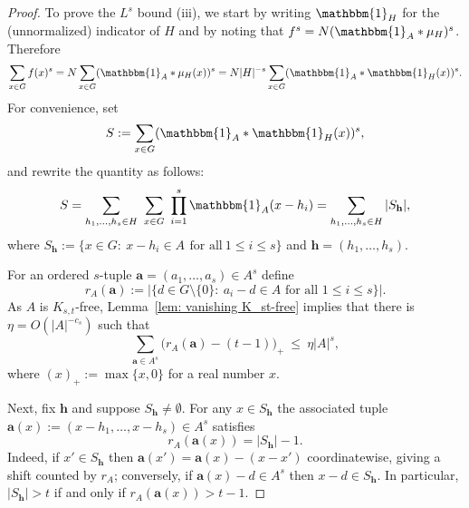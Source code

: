 \documentclass[A4paper,reqno,oneside,12pt]{amsart}
\theoremstyle{plain}
\theoremstyle{definition}
\newcommand{\e}{\mathbbm{1}}          %
\begin{document}
\begin{proof}
To prove the $L^s$ bound (iii), we start by writing $\e_H$ for the (unnormalized) indicator of $H$ and by noting that
$f^s=N(\e_A*\mu_H)^s$.  Therefore
\begin{equation}\label{eqn: fs}
\sum_{x\in G} f(x)^s
=
N\sum_{x\in G} (\e_A*\mu_H(x))^s
=
N|H|^{-s}\sum_{x\in G} (\e_A*\e_H(x))^s.  
\end{equation}
For convenience, set
\[
S:=\sum_{x\in G} (\e_A*\e_H(x))^s,
\]
and rewrite the quantity as follows:
\[
S=\sum_{h_1,\dots,h_s\in H}\ \sum_{x\in G}\ \prod_{i=1}^s \e_A(x-h_i)
=\sum_{h_1,\dots,h_s\in H} |S_{\mathbf{h}}|,
\]
where $S_{\mathbf{h}}:=\{x\in G:\ x-h_i\in A\,\ \text{for all}\ 1\le i \le s\}$ and $\mathbf{h}=(h_1,\dots,h_s)$.

For an ordered $s$-tuple $\mathbf{a}=(a_1,\dots,a_s)\in A^s$ define
\[
r_A(\mathbf{a})
:=
\bigl|\{d\in G\setminus\{0\}:\ a_i-d\in A \text{ for all }1\le i\le s\}\bigr|.
\]
As $A$ is $K_{s,t}$-free, Lemma~\ref{lem: vanishing K_st-free} implies that there is $\eta = O(|A|^{-c_s})$ such that 
\begin{equation}\label{eq:excess_rA}
\sum_{\mathbf{a}\in A^s}\bigl(r_A(\mathbf{a})-(t-1)\bigr)_+ \ \le\ \eta |A|^s,
\end{equation}
 where $(x)_+ := \max\{x,0\}$ for a real number $x$. 

Next, fix $\mathbf{h}$ and suppose $S_{\mathbf{h}}\neq\emptyset$.  For any $x\in S_{\mathbf{h}}$ the
associated tuple $\mathbf{a}(x):=(x-h_1,\dots,x-h_s)\in A^s$ satisfies
\begin{equation}\label{eq:rA_equals_size}
r_A(\mathbf{a}(x))=|S_{\mathbf{h}}|-1.
\end{equation}
Indeed, if $x'\in S_{\mathbf{h}}$ then $\mathbf{a}(x')=\mathbf{a}(x)-(x-x')$ coordinatewise, giving a shift
counted by $r_A$; conversely, if $\mathbf{a}(x)-d\in A^s$ then $x-d\in S_{\mathbf{h}}$.
In particular, $|S_{\mathbf{h}}|>t$ if and only if $r_A(\mathbf{a}(x))>t-1$.


\end{proof}
\end{document}
